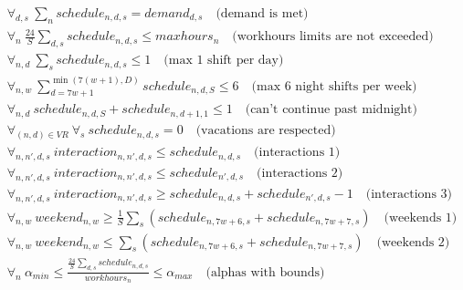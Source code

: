 \documentclass{article}
\begin{document}
\begin{align*}
&\forall_{d,s}\ \sum_n schedule_{n,d,s} = demand_{d, s}\quad \text{(demand is met)} \\
&\forall_{n}\ \frac{24}S \sum_{d, s} schedule_{n,d,s} \leq maxhours_n \quad \text{(workhours limits are not exceeded)} \\
&\forall_{n,d}\ \sum_s schedule_{n,d,s} \leq 1\quad \text{(max 1 shift per day)} \\
&\forall_{n,w}\ \sum_{d=7w+1}^{\min(7(w+1), D)} schedule_{n,d,S} \leq 6\quad \text{(max 6 night shifts per week)} \\
&\forall_{n,d}\ schedule_{n,d,S}+schedule_{n,d+1,1} \leq 1\quad \text{(can't continue past midnight)} \\
&\forall_{(n,d)\in VR}\ \forall_s\ schedule_{n,d,s} = 0\quad \text{(vacations are respected)} \\
&\forall_{n,n',d,s}\ interaction_{n,n',d,s} \leq schedule_{n,d,s}\quad \text{(interactions 1)} \\
&\forall_{n,n',d,s}\ interaction_{n,n',d,s} \leq schedule_{n',d,s}\quad \text{(interactions 2)} \\
&\forall_{n,n',d,s}\ interaction_{n,n',d,s} \geq schedule_{n,d,s}+schedule_{n',d,s}-1\quad \text{(interactions 3)} \\
&\forall_{n, w}\ weekend_{n, w} \geq \frac{1}{S}\sum_s (schedule_{n, 7w+6, s} + schedule_{n, 7w+7, s}) \quad \text{(weekends 1)} \\
&\forall_{n, w}\ weekend_{n, w} \leq \sum_s (schedule_{n, 7w+6, s} + schedule_{n, 7w+7, s}) \quad \text{(weekends 2)} \\
&\forall_{n}\ \alpha_{min} \leq \frac{\frac{24}{S}\sum_{d,s}schedule_{n,d,s}}{workhours_n} \leq \alpha_{max}\quad \text{(alphas with bounds)}
\end{align*}
\end{document}
